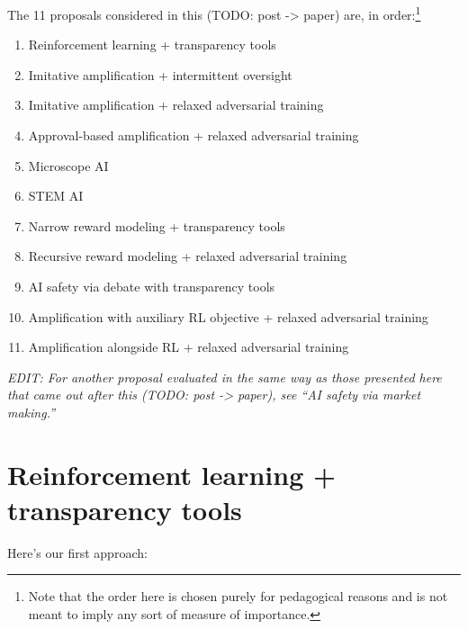 \documentclass[
  onecolumn,
  natbib,
]{miri-tech-article}
\begin{document}
The 11 proposals considered in this (TODO: post -> paper) are, in order:\footnote{Note that the order here is chosen purely for pedagogical reasons and is not meant to imply any sort of measure of importance.}

\begin{enumerate}
\item Reinforcement learning + transparency tools
\item Imitative amplification + intermittent oversight
\item Imitative amplification + relaxed adversarial training
\item Approval-based amplification + relaxed adversarial training
\item Microscope AI
\item STEM AI
\item Narrow reward modeling + transparency tools
\item Recursive reward modeling + relaxed adversarial training
\item AI safety via debate with transparency tools
\item Amplification with auxiliary RL objective + relaxed adversarial training
\item Amplification alongside RL + relaxed adversarial training
\end{enumerate}

\textit{EDIT: For another proposal evaluated in the same way as those presented here that came out after this (TODO: post -> paper), see ``AI safety via market making\cite{TODO: cite https://www.alignmentforum.org/posts/YWwzccGbcHMJMpT45/ai-safety-via-market-making}.''}

\section{Reinforcement learning + transparency tools}
\label{sec:1}

Here's our first approach:
\end{document}
